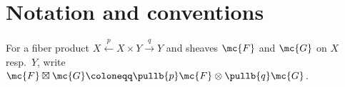\section{Notation and conventions}



For a fiber product $X \xleftarrow{p} X\times Y\xrightarrow{q} Y$ and sheaves $\mc{F}$ and $\mc{G}$ on $X$ resp.\ $Y$, write $\mc{F}\boxtimes \mc{G}\coloneqq \pullb{p} \mc{F} \otimes \pullb{q} \mc{G}$.